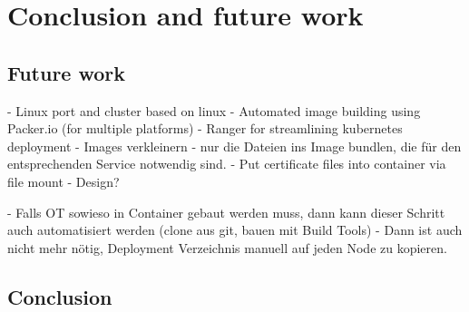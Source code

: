 \chapter{Conclusion and future work} %

\label{chap:conclusion} %




\section{Future work}
- Linux  port and cluster based on linux
- Automated image building using Packer.io (for multiple platforms)
- Ranger for streamlining kubernetes deployment
- Images verkleinern - nur die Dateien ins Image bundlen, die für den entsprechenden Service notwendig sind.
- Put certificate files into container via file mount - Design?

- Falls OT sowieso in Container gebaut werden muss, dann kann dieser Schritt auch automatisiert werden (clone aus git, bauen mit Build Tools)
 - Dann ist auch nicht mehr nötig, Deployment Verzeichnis manuell auf jeden Node zu kopieren.




\section{Conclusion}